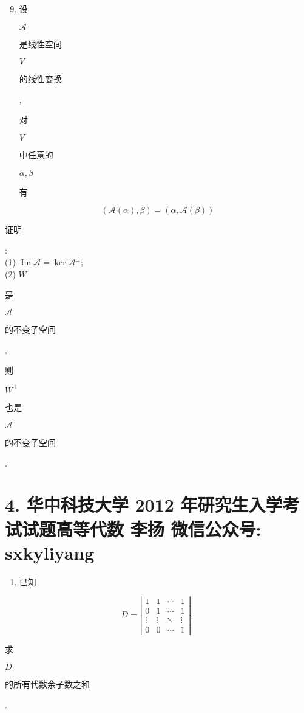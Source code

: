 \documentclass[10pt]{article}
\begin{document}
\begin{enumerate}
  \setcounter{enumi}{8}
  \item \begin{CJK}{UTF8}{mj}设\end{CJK} $\mathscr{A}$ \begin{CJK}{UTF8}{mj}是线性空间\end{CJK} $V$ \begin{CJK}{UTF8}{mj}的线性变换\end{CJK}, \begin{CJK}{UTF8}{mj}对\end{CJK} $V$ \begin{CJK}{UTF8}{mj}中任意的\end{CJK} $\alpha, \beta$ \begin{CJK}{UTF8}{mj}有\end{CJK}
\end{enumerate}
$$
(\mathscr{A}(\alpha), \beta)=(\alpha, \mathscr{A}(\beta))
$$
\begin{CJK}{UTF8}{mj}证明\end{CJK}:\\
(1) $\operatorname{Im} \mathscr{A}=\operatorname{ker} \mathscr{A}^{\perp}$;\\
(2) $W$ \begin{CJK}{UTF8}{mj}是\end{CJK} $\mathscr{A}$ \begin{CJK}{UTF8}{mj}的不变子空间\end{CJK}, \begin{CJK}{UTF8}{mj}则\end{CJK} $W^{\perp}$ \begin{CJK}{UTF8}{mj}也是\end{CJK} $\mathscr{A}$ \begin{CJK}{UTF8}{mj}的不变子空间\end{CJK}.

\section{4. 华中科技大学 2012 年研究生入学考试试题高等代数 
 李扬 
 微信公众号: sxkyliyang}
\begin{enumerate}
  \item \begin{CJK}{UTF8}{mj}已知\end{CJK}
\end{enumerate}
$$
D=\left|\begin{array}{cccc}
1 & 1 & \cdots & 1 \\
0 & 1 & \cdots & 1 \\
\vdots & \vdots & \ddots & \vdots \\
0 & 0 & \cdots & 1
\end{array}\right|,
$$
\begin{CJK}{UTF8}{mj}求\end{CJK} $D$ \begin{CJK}{UTF8}{mj}的所有代数余子数之和\end{CJK}.
\end{document}
